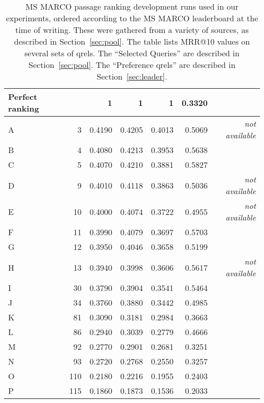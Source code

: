 \documentclass[fullpage]{article}
\begin{document}
{\begin{landscape}
\begin{table}[p]
\begin{center}
\begin{tabular}{|l|r|r|r|r|r|r|}
\rowcolor[HTML]{FFFFFF} 
Perfect ranking &  & 1 & 1 & 1 & 0.3320 & \\ \hline
\rowcolor[HTML]{FFFFFF} 
A & 3 & 0.4190 & 0.4205 & 0.4013 & 0.5069 & {\em not available} \\ \hline
\rowcolor[HTML]{FFFFFF} 
B & 4 & 0.4080 & 0.4213 & 0.3953 & 0.5638 &  \citet{pradeep2021expando} \\ \hline
\rowcolor[HTML]{FFFFFF} 
C & 5 & 0.4070 & 0.4210 & 0.3881 & 0.5827 &  \citet{han2020learning}\\ \hline
\rowcolor[HTML]{FFFFFF} 
D & 9 & 0.4010 & 0.4118 & 0.3863 & 0.5036 &  {\em not available}\\ \hline
\rowcolor[HTML]{FFFFFF} 
E & 10 & 0.4000 & 0.4074 & 0.3722 & 0.4955 & {\em not available}\\ \hline
\rowcolor[HTML]{FFFFFF} 
F & 11 & 0.3990 & 0.4079 & 0.3697 & 0.5703 & \citet{hofstatter2020improving} \\ \hline
\rowcolor[HTML]{FFFFFF} 
G & 12 & 0.3950 & 0.4046 & 0.3658 & 0.5199 & \citet{han2020learning} \\ \hline
\rowcolor[HTML]{FFFFFF} 
H & 13 & 0.3940 & 0.3998 & 0.3606 & 0.5617 & {\em not available} \\ \hline
\rowcolor[HTML]{FFFFFF} 
I & 30 & 0.3790 & 0.3904 & 0.3541 & 0.5464 & \citet{nogueira2019multi} \\ \hline
\rowcolor[HTML]{FFFFFF} 
J & 34 & 0.3760 & 0.3880 & 0.3442 & 0.4985 & \citet{liu2021openmatch} \\ \hline
\rowcolor[HTML]{FFFFFF} 
K & 81 & 0.3090 & 0.3181 & 0.2984 & 0.3663 & \citet{hofstatter2019effect} \\ \hline
\rowcolor[HTML]{FFFFFF} 
L & 86 & 0.2940 & 0.3039 & 0.2779 & 0.4666 & \citet{zhan2020repbert} \\ \hline
\rowcolor[HTML]{FFFFFF} 
M & 92 & 0.2770 & 0.2901 & 0.2681 & 0.3251 & \citet{hofstatter2019effect} \\ \hline
\rowcolor[HTML]{FFFFFF} 
N & 93 & 0.2720 & 0.2768 & 0.2550 & 0.3257 & \citet{nogueira2019doc2query}\ \\ \hline
\rowcolor[HTML]{FFFFFF} 
O & 110 & 0.2180 & 0.2216 & 0.1955 & 0.2403 &  \citet{nogueira2019document} \\ \hline
\rowcolor[HTML]{FFFFFF} 
P & 115 & 0.1860 & 0.1873 & 0.1536 & 0.2033 &  \citet{yang2017anserini}\\ \hline
\end{tabular}
\end{center}
\caption{MS MARCO passage ranking development runs used in our experiments, ordered according to the MS MARCO leaderboard at the time of writing. These were gathered from a variety of sources, as described in Section~\ref{sec:pool}. The table lists MRR@10 values on several sets of qrels. The ``Selected Queries'' are described in Section~\ref{sec:pool}. The ``Preference qrels'' are described in Section~\ref{sec:leader}.}
\label{tab:main}
\end{table}
\end{landscape}
\clearpage
}
\end{document}
